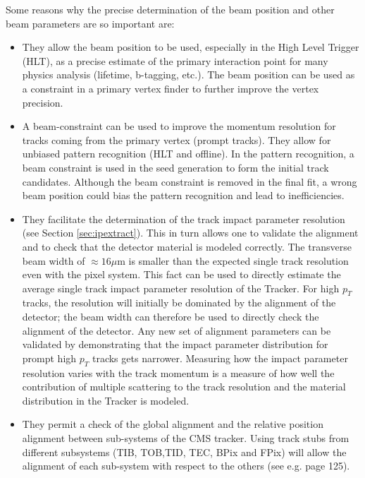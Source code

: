 \documentclass{cmspaper}
\begin{document}
Some reasons why the precise determination of the beam position and other beam parameters are so important are: 

\begin{itemize}
\item   They allow the beam position to be used, especially in the High Level Trigger (HLT), as a precise estimate of the primary interaction point for many physics analysis (lifetime, b-tagging, etc.).
        The beam position can be used as a constraint in a primary vertex finder to further improve the vertex precision.  
\item   A beam-constraint can be used to improve the momentum resolution for tracks coming from the primary vertex (prompt tracks). They allow for unbiased pattern recognition (HLT and offline). In the pattern recognition,  a beam constraint is used in the seed generation 
        to form the initial track candidates. Although the beam constraint is removed in the final fit,  a wrong beam position could bias the pattern recognition 
        and lead to inefficiencies.

\item   They facilitate the determination of the track impact parameter resolution (see Section \ref{sec:ipextract}). This in turn allows one to 
        validate the alignment and to check that the detector material is
        modeled correctly. The transverse beam width of  $\approx 16 \mu$m 
        is smaller  than the expected single track resolution even with the pixel system. This fact can be used to directly estimate the average single track 
        impact  parameter
        resolution of the Tracker. For high $p_T$ tracks, the resolution will initially be dominated by the alignment of the detector; 
	the beam width can therefore be used to directly check the alignment of the detector. Any new set of alignment parameters  can be validated by demonstrating that the impact 
        parameter distribution for prompt high $p_T$ tracks gets narrower. Measuring how the impact parameter resolution varies with the track momentum  is a measure of how well the
        contribution of multiple scattering to the track resolution and the material distribution in the Tracker is modeled.


\item   They permit a check of the global alignment and the relative position alignment between sub-systems of the CMS tracker. Using track stubs
       from different subsystems  
        (TIB, TOB,TID, TEC, BPix and FPix) will allow the alignment of each 
sub-system with respect to the others (see e.g. \cite{NIM} page 125).


\end{itemize}
\end{document}
